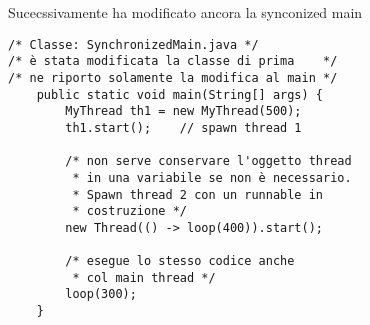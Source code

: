 \noindent Sucecssivamente ha modificato ancora la synconized main

\begin{lstlisting}
/* Classe: SynchronizedMain.java */
/* è stata modificata la classe di prima    */
/* ne riporto solamente la modifica al main */
    public static void main(String[] args) {
        MyThread th1 = new MyThread(500);
        th1.start();    // spawn thread 1

        /* non serve conservare l'oggetto thread 
         * in una variabile se non è necessario.
         * Spawn thread 2 con un runnable in
         * costruzione */
        new Thread(() -> loop(400)).start();    

        /* esegue lo stesso codice anche
         * col main thread */
        loop(300);  
    }

\end{lstlisting}










